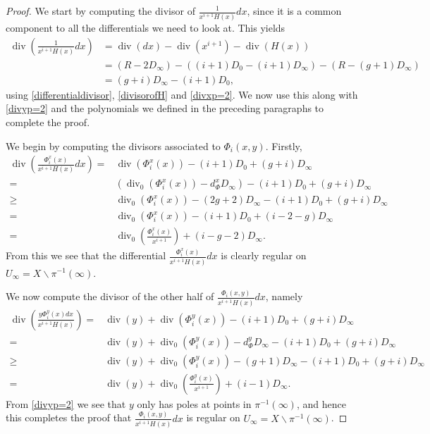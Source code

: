 \documentclass[draft, 11pt]{article} %
\theoremstyle{plain}
\theoremstyle{remark}
\DeclareMathOperator{\di}{div}
\begin{document}
\begin{proof}
We start by computing the divisor of $\frac{1}{x^{i+1}H(x)}dx$, since it is a common component to all the differentials we need to look at.
This yields
\begin{align}
\di \left( \frac{1}{x^{i+1}H(x)}dx \right) & = \di(dx) - \di (x^{i+1}) - \di (H(x)) \nonumber \\
& = (R-2D_\infty) - ((i+1)D_0 - (i+1)D_\infty) - (R - (g+1)D_\infty) \nonumber \\
& = (g+i)D_\infty - (i+1)D_0,
\end{align}
using \eqref{differentialdivisor}, \eqref{divisorofH} and \eqref{divxp=2}.
We now use this along with \eqref{divyp=2} and the polynomials we defined in the preceding paragraphs to complete the proof.

We begin by computing the divisors associated to $\Phi_i(x,y)$.
Firstly,
\begin{align*}
\di \left( \frac{\Phi_i^x(x) }{x^{i+1} H(x)}dx \right)  = &  \di(\Phi_i^x(x)) -(i+1)D_0 + (g+i)D_\infty\\
 = & \left( \di_0(\Phi_i^x(x)) -d_\Phi^xD_\infty\right) -(i+1)D_0 + (g+i)D_\infty\\
 \geq & \di_0(\Phi_i^x(x)) - (2g+2)D_\infty - (i+1)D_0 + (g+i)D_\infty \\
 = &  \di_0(\Phi_i^x(x)) - (i+1)D_0 + (i-2-g)D_\infty \\
 =  & \di_0 \left( \frac{\Phi_i^x(x)}{x^{i+1}} \right) + (i-g-2)D_\infty.
\end{align*}
From this we see that the differential $\frac{\Phi_i^x(x)}{x^{i+1}H(x)}dx$ is clearly regular on $U_\infty = X \backslash \pi^{-1}(\infty)$.

We now compute the divisor of the other half of $\frac{\Phi_i(x,y)}{x^{i+1}H(x)}dx$, namely
\begin{align*}
\di\left(\frac{y\Phi_i^y(x) dx}{x^{i+1}H(x)} \right)  = & \di(y) + \di(\Phi_i^y(x)) -(i+1)D_0 + (g+i)D_\infty\\
 = & \di(y) + \di_0(\Phi_i^y(x)) - d_\Phi^yD_\infty -(i+1)D_0 + (g+i)D_\infty \\
 \geq & \di(y) + \di_0(\Phi_i^y(x)) - (g+1)D_\infty - (i+1)D_0 + (g+i)D_\infty \\
 = & \di(y) + \di_0\left(\frac{\Phi_i^y(x)}{x^{i+1}} \right) + (i-1)D_\infty.
\end{align*}
From \eqref{divyp=2} we see that $y$ only has poles at points in $\pi^{-1}(\infty)$, and hence this completes the proof that $\frac{\Phi_i(x,y) }{x^{i+1}H(x)}dx$ is regular on $U_\infty = X \backslash \pi^{-1}(\infty)$.


\end{proof}
\end{document}
